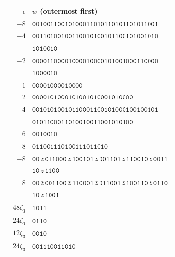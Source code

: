 \begin{center}\small\begin{tabular}{@{}r l@{}}\toprule $c$ & $w$ (outermost first)\\\midrule
$-8$ & \(\mathtt{0010011}\)\quad \(\mathtt{0010100}\)\quad \(\mathtt{0110101}\)\quad \(\mathtt{1010110}\)\quad \(\mathtt{1011001}\)\\
$-4$ & \(\mathtt{0011010}\)\quad \(\mathtt{0100110}\)\quad \(\mathtt{0101001}\)\quad \(\mathtt{0110010}\)\quad \(\mathtt{1001010}\)\\
 & \(\mathtt{1010010}\)\\
$-2$ & \(\mathtt{0000110}\)\quad \(\mathtt{0001000}\)\quad \(\mathtt{0100001}\)\quad \(\mathtt{0100100}\)\quad \(\mathtt{0110000}\)\\
 & \(\mathtt{1000010}\)\\
$1$ & \(\mathtt{0000100}\)\quad \(\mathtt{0010000}\)\\
$2$ & \(\mathtt{0000101}\)\quad \(\mathtt{0001010}\)\quad \(\mathtt{0101000}\)\quad \(\mathtt{1010000}\)\\
$4$ & \(\mathtt{0010101}\)\quad \(\mathtt{0010110}\)\quad \(\mathtt{0011001}\)\quad \(\mathtt{0100010}\)\quad \(\mathtt{0100101}\)\\
 & \(\mathtt{0101100}\)\quad \(\mathtt{0110100}\)\quad \(\mathtt{1001100}\)\quad \(\mathtt{1010100}\)\\
$6$ & \(\mathtt{0010010}\)\\
$8$ & \(\mathtt{0110011}\)\quad \(\mathtt{1010011}\)\quad \(\mathtt{1011010}\)\\
\midrule
$-8$ & \(\mathtt{00}\,\bar z\,\mathtt{0110}\)\quad \(\mathtt{00}\,\bar z\,\mathtt{1001}\)\quad \(\mathtt{01}\,\bar z\,\mathtt{0011}\)\quad \(\mathtt{01}\,\bar z\,\mathtt{1100}\)\quad \(\mathtt{10}\,\bar z\,\mathtt{0011}\)\\
 & \(\mathtt{10}\,\bar z\,\mathtt{1100}\)\\
$8$ & \(\mathtt{00}\,\bar z\,\mathtt{0011}\)\quad \(\mathtt{00}\,\bar z\,\mathtt{1100}\)\quad \(\mathtt{01}\,\bar z\,\mathtt{0110}\)\quad \(\mathtt{01}\,\bar z\,\mathtt{1001}\)\quad \(\mathtt{10}\,\bar z\,\mathtt{0110}\)\\
 & \(\mathtt{10}\,\bar z\,\mathtt{1001}\)\\
\midrule
$-48\zeta_3$ & \(\mathtt{1011}\)\\
$-24\zeta_3$ & \(\mathtt{0110}\)\\
$12\zeta_3$ & \(\mathtt{0010}\)\\
$24\zeta_3$ & \(\mathtt{0011}\)\quad \(\mathtt{1001}\)\quad \(\mathtt{1010}\)\\
\bottomrule\end{tabular}\end{center}

